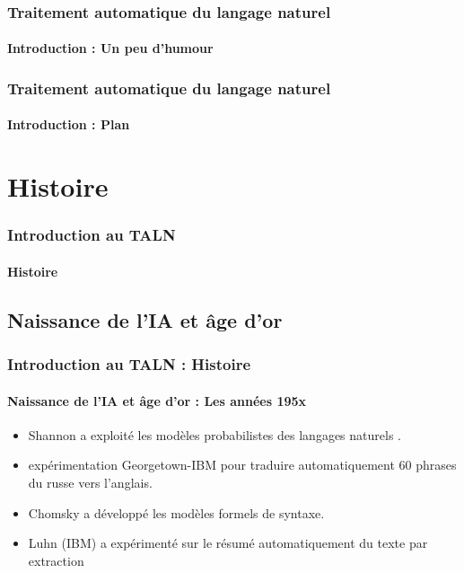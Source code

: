 \documentclass[xcolor=table]{beamer}
\begin{document}
\begin{frame}
\frametitle{Traitement automatique du langage naturel}
\framesubtitle{Introduction : Un peu d'humour}

\begin{center}
\end{center}

\end{frame}

\begin{frame}
\frametitle{Traitement automatique du langage naturel}
\framesubtitle{Introduction : Plan}

\begin{multicols}{2}
\tableofcontents
\end{multicols}
\end{frame}

\section{Histoire}

\begin{frame}
\frametitle{Introduction au TALN}
\framesubtitle{Histoire}


\end{frame}

\subsection{Naissance de l'IA et âge d'or}

\begin{frame}
\frametitle{Introduction au TALN : Histoire}
\framesubtitle{Naissance de l'IA et âge d'or : Les années 195x}

\begin{itemize}
	\item {} Shannon a exploité les modèles probabilistes des langages naturels \cite{1951-shannon}.
	\item {} expérimentation Georgetown-IBM pour traduire automatiquement 60 phrases du russe vers l'anglais.
	\item {} Chomsky a développé les modèles formels de syntaxe.
	\item {} Luhn (IBM) a expérimenté sur le résumé automatiquement du texte par extraction \cite{1958-luhn}
\end{itemize}

\end{frame}
\end{document}
